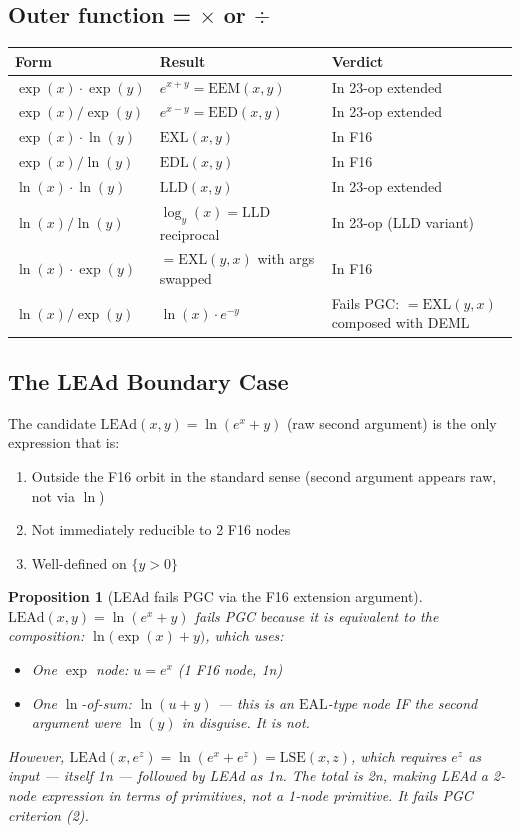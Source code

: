 \documentclass[11pt]{article}
\newtheorem{proposition}[theorem]{Proposition}
\begin{document}
\subsection{Outer function = $\times$ or $\div$}

\begin{center}
\renewcommand{\arraystretch}{1.2}
\begin{tabular}{lll}
\toprule
Form & Result & Verdict \\
\midrule
$\exp(x) \cdot \exp(y)$ & $e^{x+y} = \mathrm{EEM}(x,y)$ & In 23-op extended \\
$\exp(x) / \exp(y)$ & $e^{x-y} = \mathrm{EED}(x,y)$ & In 23-op extended \\
$\exp(x) \cdot \ln(y)$ & $\mathrm{EXL}(x,y)$ & In F16 \\
$\exp(x) / \ln(y)$ & $\mathrm{EDL}(x,y)$ & In F16 \\
$\ln(x) \cdot \ln(y)$ & $\mathrm{LLD}(x,y)$ & In 23-op extended \\
$\ln(x) / \ln(y)$ & $\log_y(x) = \mathrm{LLD}$ reciprocal & In 23-op (LLD variant) \\
$\ln(x) \cdot \exp(y)$ & $= \mathrm{EXL}(y,x)$ with args swapped & In F16 \\
$\ln(x) / \exp(y)$ & $\ln(x) \cdot e^{-y}$ & Fails PGC: $= \mathrm{EXL}(y,x)$ composed with DEML \\
\bottomrule
\end{tabular}
\end{center}

\subsection{The LEAd Boundary Case}
\label{sec:lead}

The candidate $\mathrm{LEAd}(x,y) = \ln(e^x + y)$ (raw second argument) is the
only expression that is:
\begin{enumerate}
  \item Outside the F16 orbit in the standard sense (second argument appears raw, not via $\ln$)
  \item Not immediately reducible to 2 F16 nodes
  \item Well-defined on $\{y > 0\}$
\end{enumerate}

\begin{proposition}[LEAd fails PGC via the F16 extension argument]
$\mathrm{LEAd}(x,y) = \ln(e^x + y)$ fails PGC because it is equivalent to the
composition: $\ln \bigl( \exp(x) + y \bigr)$, which uses:
\begin{itemize}
  \item One $\exp$ node: $u = e^x$ (1 F16 node, 1n)
  \item One $\ln$-of-sum: $\ln(u + y)$ — this is an $\mathrm{EAL}$-type node IF
    the second argument were $\ln(y)$ in disguise. It is not.
\end{itemize}
However, $\mathrm{LEAd}(x, e^z) = \ln(e^x + e^z) = \mathrm{LSE}(x,z)$,
which requires $e^z$ as input — itself 1n — followed by LEAd as 1n.
The total is 2n, making LEAd a \emph{2-node} expression in terms of primitives,
not a 1-node primitive. It fails PGC criterion (2).
\end{proposition}
\end{document}
